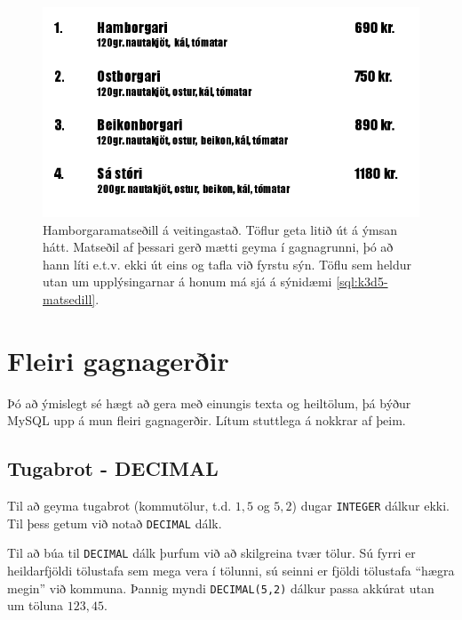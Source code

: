 \begin{figure}
\caption[Matseðill]{Hamborgaramatseðill á veitingastað. Töflur geta litið út á ýmsan hátt. Matseðil af þessari gerð mætti geyma í gagnagrunni, þó að hann líti e.t.v. ekki út eins og tafla við fyrstu sýn. Töflu sem heldur utan um upplýsingarnar á honum má sjá á sýnidæmi \ref{sql:k3d5-matsedill}. }
\label{mynd:matsedill}
\includegraphics[width=\textwidth]{myndir/matsedill}
\end{figure}

\begin{example}
\caption[Matseðill]{SQL-framsetning á matseðlinum á mynd \ref{mynd:matsedill}. Við gerum ráð fyrir að lýsingin á réttinum þurfi meira pláss en nafn hans.}
\label{sql:k3d5-matsedill}
\centering
{}
\end{example}

\section{Fleiri gagnagerðir}
Þó að ýmislegt sé hægt að gera með einungis texta og heiltölum, þá býður MySQL upp á mun fleiri gagnagerðir. Lítum stuttlega á nokkrar af þeim.
\subsection{Tugabrot - DECIMAL}
Til að geyma tugabrot (kommutölur, t.d. $1,5$ og $5,2$) dugar \verb|INTEGER| dálkur ekki. Til þess getum við notað \verb|DECIMAL| dálk.

Til að búa til \verb|DECIMAL| dálk þurfum við að skilgreina tvær tölur. Sú fyrri er heildarfjöldi tölustafa sem mega vera í tölunni, sú seinni er fjöldi tölustafa ``hægra megin'' við kommuna. Þannig myndi \verb|DECIMAL(5,2)| dálkur passa akkúrat utan um töluna $123,45$.

